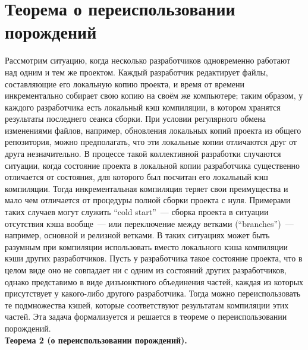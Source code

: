 \newpage
\section{Теорема о переиспользовании порождений}

Рассмотрим ситуацию, когда несколько разработчиков одновременно работают над одним и тем же проектом. Каждый разработчик редактирует файлы, составляющие его локальную копию проекта, и время от времени инкрементально собирает свою копию на своём же компьютере; таким образом, у каждого разработчика есть локальный кэш компиляции, в котором хранятся результаты последнего сеанса сборки. При условии регулярного обмена изменениями файлов, например, обновления локальных копий проекта из общего репозитория, можно предполагать, что эти локальные копии отличаются друг от друга незначительно. В процессе такой коллективной разработки случаются ситуации, когда состояние проекта в локальной копии разработчика существенно отличается от состояния, для которого был посчитан его локальный кэш компиляции. Тогда инкрементальная компиляция теряет свои преимущества и мало чем отличается от процедуры полной сборки проекта с нуля. Примерами таких случаев могут служить ``cold start''~--- сборка проекта в ситуации отсутствия кэша вообще~--- или переключение между ветками (``branches'')~--- например, основной и релизной ветками. В таких ситуациях может быть разумным при компиляции использовать вместо локального кэша компиляции кэши других разработчиков. Пусть у разработчика такое состояние проекта, что в целом виде оно не совпадает ни с одним из состояний других разработчиков, однако представимо в виде дизъюнктного объединения частей, каждая из которых присутствует у какого-либо другого разработчика. Тогда можно переиспользовать те подмножества кэшей, которые соответствуют результатам компиляции этих частей. Эта задача формализуется и решается в теореме о переиспользовании порождений.\\

\textbf{Теорема 2 (о переиспользовании порождений).}

\newcommand{\sigi}{{\sigma_i}}
\newcommand{\sigk}{{\sigma_k}}
\newcommand{\sigpi}{{\sigma^\prime_i}}
\newcommand{\sigpj}{{\sigma^\prime_j}}
\newcommand{\sigpk}{{\sigma^\prime_k}}
\newcommand{\parti}{{\partial_i}}
\newcommand{\partj}{{\partial_j}}
\newcommand{\partk}{{\partial_k}}
\newcommand{\xii}{{\xi_i}}
\newcommand{\xij}{{\xi_j}}
\newcommand{\xik}{{\xi_k}}
\newcommand{\sms}{{\setminus}}
\newcommand{\alloth}{\bigcup\limits_{j \neq i}\omega^\prime_j}
\newcommand{\allothk}{\bigcup\limits_{j \neq k}\omega^\prime_j}
\newcommand{\allothD}{\bigcup\limits_{j \neq i}\omega^\Delta_{\sigpj}}
\newcommand{\rprt}{{\text{п.ч.}}}

